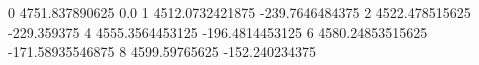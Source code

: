 0 4751.837890625 0.0
1 4512.0732421875 -239.7646484375
2 4522.478515625 -229.359375
4 4555.3564453125 -196.4814453125
6 4580.24853515625 -171.58935546875
8 4599.59765625 -152.240234375
